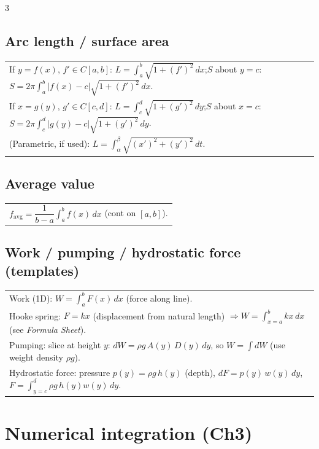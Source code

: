 \documentclass[10pt]{article}
\newcommand{\FS}{\textit{Formula Sheet}}
\newcommand{\dx}{\,dx}
\newcommand{\dy}{\,dy}
\begin{document}
\begin{multicols}{3}
\subsection*{Arc length / surface area}
\vspace{-1pt}
\begin{tabular}{@{}p{}@{}}
If $y=f(x)$, $f'\in C[a,b]$: $L=\int_a^b\sqrt{1+(f')^2}\dx$;\quad $S$ about $y=c$: $S=2\pi\int_a^b |f(x)-c|\sqrt{1+(f')^2}\dx$.\\
If $x=g(y)$, $g'\in C[c,d]$: $L=\int_c^d\sqrt{1+(g')^2}\dy$;\quad $S$ about $x=c$: $S=2\pi\int_c^d |g(y)-c|\sqrt{1+(g')^2}\dy$.\\
(Parametric, if used): $L=\int_\alpha^\beta\sqrt{(x')^2+(y')^2}\,dt$.\\
\end{tabular}

\subsection*{Average value}
\vspace{-1pt}
\begin{tabular}{@{}p{}@{}}
$f_{\text{avg}}=\dfrac{1}{b-a}\int_a^b f(x)\dx$ (cont on $[a,b]$).\\
\end{tabular}

\subsection*{Work / pumping / hydrostatic force (templates)}
\vspace{-1pt}
\begin{tabular}{@{}p{}@{}}
Work (1D): $W=\int_a^b F(x)\dx$ (force along line).\\
Hooke spring: $F=kx$ (displacement from natural length) $\Rightarrow W=\int_{x=a}^{b}kx\dx$ (see \FS).\\
Pumping: slice at height $y$: $dW=\rho g\,A(y)\,D(y)\dy$, so $W=\int dW$ (use weight density $\rho g$).\\
Hydrostatic force: pressure $p(y)=\rho g\,h(y)$ (depth), $dF=p(y)\,w(y)\dy$, $F=\int_{y=c}^{d}\rho g\,h(y)w(y)\dy$.\\
\end{tabular}

\section*{Numerical integration (Ch3)}

\end{multicols}
\end{document}
